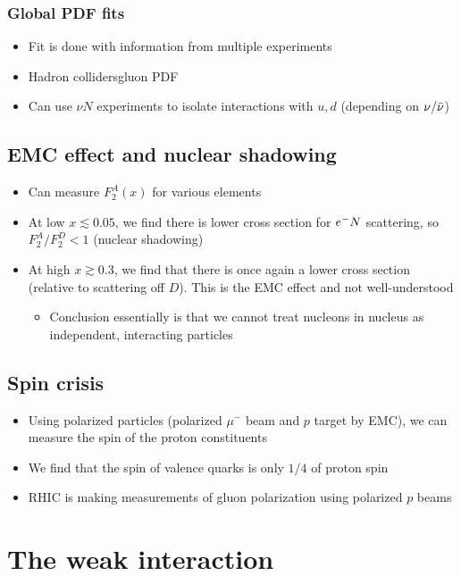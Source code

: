 \subsubsection{Global PDF fits}
\begin{itemize}
  \item Fit is done with information from multiple experiments
  \item Hadron colliders\thus gluon PDF
  \item Can use $\nu N$ experiments to isolate interactions with $u,d$ (depending on $\nu/{\bar{\nu}}$)
\end{itemize}

\subsection{EMC effect and nuclear shadowing}
\begin{itemize}
  \item Can measure $F_2^{A}(x)$ for various elements
  \item At low $x\lesssim0.05$, we find there is lower cross section for $e^{-} N$ scattering, so $F_2^A/F_2^D<1$ (nuclear shadowing)
  \item At high $x\gtrsim0.3$, we find that there is once again a lower cross section (relative to scattering off $D$). This is the EMC effect and not well-understood
  \begin{itemize}
    \item Conclusion essentially is that we cannot treat nucleons in nucleus as independent, interacting particles
  \end{itemize}
\end{itemize}

\subsection{Spin crisis}
\begin{itemize}
  \item Using polarized particles (polarized $\mu^-$ beam and $p$ target by EMC), we can measure the spin of the proton constituents
  \item We find that the spin of valence quarks is only $1/4$ of proton spin
  \item RHIC is making measurements of gluon polarization using polarized $p$ beams
\end{itemize}

\section{The weak interaction}
